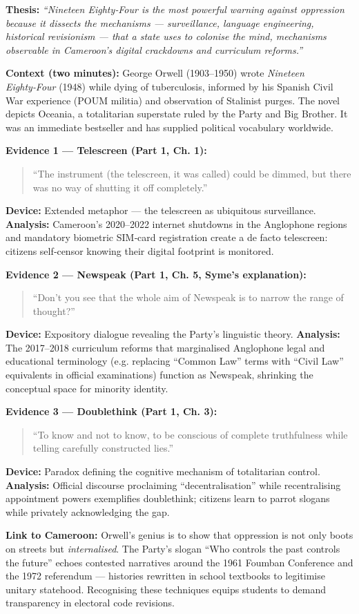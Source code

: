 \documentclass[11pt]{article}
\begin{document}
\begin{exemplebox}
\textbf{Thesis:} \emph{“Nineteen Eighty‑Four is the most powerful warning against oppression because it dissects the mechanisms — surveillance, language engineering, historical revisionism — that a state uses to colonise the mind, mechanisms observable in Cameroon’s digital crackdowns and curriculum reforms.”}

\textbf{Context (two minutes):} George Orwell (1903–1950) wrote \emph{Nineteen Eighty‑Four} (1948) while dying of tuberculosis, informed by his Spanish Civil War experience (POUM militia) and observation of Stalinist purges. The novel depicts Oceania, a totalitarian superstate ruled by the Party and Big Brother. It was an immediate bestseller and has supplied political vocabulary worldwide.

\textbf{Evidence 1 — Telescreen (Part 1, Ch. 1):} 
\begin{quote}
“The instrument (the telescreen, it was called) could be dimmed, but there was no way of shutting it off completely.”
\end{quote}
\textbf{Device:} Extended metaphor — the telescreen as ubiquitous surveillance. 
\textbf{Analysis:} Cameroon’s 2020–2022 internet shutdowns in the Anglophone regions and mandatory biometric SIM‑card registration create a de facto telescreen: citizens self‑censor knowing their digital footprint is monitored.

\textbf{Evidence 2 — Newspeak (Part 1, Ch. 5, Syme’s explanation):} 
\begin{quote}
“Don’t you see that the whole aim of Newspeak is to narrow the range of thought?”
\end{quote}
\textbf{Device:} Expository dialogue revealing the Party’s linguistic theory. 
\textbf{Analysis:} The 2017–2018 curriculum reforms that marginalised Anglophone legal and educational terminology (e.g. replacing “Common Law” terms with “Civil Law” equivalents in official examinations) function as Newspeak, shrinking the conceptual space for minority identity.

\textbf{Evidence 3 — Doublethink (Part 1, Ch. 3):} 
\begin{quote}
“To know and not to know, to be conscious of complete truthfulness while telling carefully constructed lies.”
\end{quote}
\textbf{Device:} Paradox defining the cognitive mechanism of totalitarian control. 
\textbf{Analysis:} Official discourse proclaiming “decentralisation” while recentralising appointment powers exemplifies doublethink; citizens learn to parrot slogans while privately acknowledging the gap.

\textbf{Link to Cameroon:} Orwell’s genius is to show that oppression is not only boots on streets but \emph{internalised}. The Party’s slogan “Who controls the past controls the future” echoes contested narratives around the 1961 Foumban Conference and the 1972 referendum — histories rewritten in school textbooks to legitimise unitary statehood. Recognising these techniques equips students to demand transparency in electoral code revisions.
\end{exemplebox}
\end{document}
